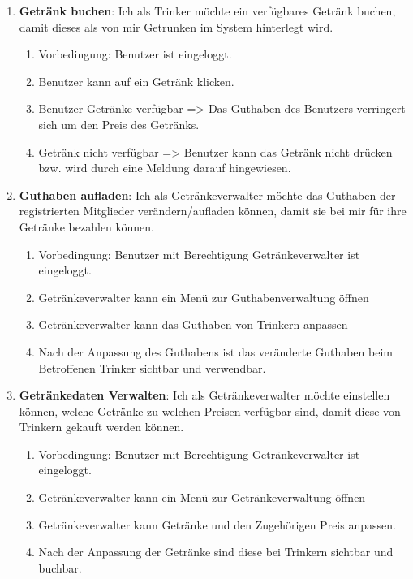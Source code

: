 \documentclass[conference,a4paper]{cs-techrep}
\begin{document}
\begin{enumerate}[{USM}1]
\item \textbf{Getränk buchen}: Ich als Trinker möchte ein verfügbares Getränk buchen, damit dieses als von mir Getrunken im System hinterlegt wird.
\begin{enumerate}
	\item Vorbedingung: Benutzer ist eingeloggt.
	\item Benutzer kann auf ein Getränk klicken.
	\item Benutzer Getränke verfügbar => Das Guthaben des Benutzers verringert sich um den Preis des Getränks.
	\item Getränk nicht verfügbar => Benutzer kann das Getränk nicht drücken bzw. wird durch eine Meldung darauf hingewiesen.
\end{enumerate}

\item \textbf{Guthaben aufladen}: Ich als Getränkeverwalter möchte das Guthaben der registrierten Mitglieder verändern/aufladen können, damit sie bei mir für ihre Getränke bezahlen können.
\begin{enumerate}
	\item Vorbedingung: Benutzer mit Berechtigung Getränkeverwalter ist eingeloggt.
	\item Getränkeverwalter kann ein Menü zur Guthabenverwaltung öffnen
	\item Getränkeverwalter kann das Guthaben von Trinkern anpassen
	\item Nach der Anpassung des Guthabens ist das veränderte Guthaben beim Betroffenen Trinker sichtbar und verwendbar.
\end{enumerate}

\item \textbf{Getränkedaten Verwalten}: Ich als Getränkeverwalter möchte einstellen können, welche Getränke zu welchen Preisen verfügbar sind, damit diese von Trinkern gekauft werden können.
\begin{enumerate}
	\item Vorbedingung: Benutzer mit Berechtigung Getränkeverwalter ist eingeloggt.
	\item Getränkeverwalter kann ein Menü zur Getränkeverwaltung öffnen
	\item Getränkeverwalter kann Getränke und den Zugehörigen Preis anpassen.
	\item Nach der Anpassung der Getränke sind diese bei Trinkern sichtbar und buchbar.
\end{enumerate}

\end{enumerate}
\end{document}
